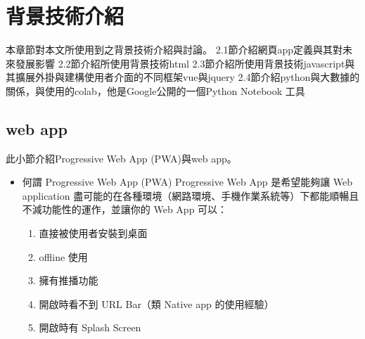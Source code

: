 \chapter{背景技術介紹}
\label{c:intro}
本章節對本文所使用到之背景技術介紹與討論。
2.1節介紹網頁app定義與其對未來發展影響
2.2節介紹所使用背景技術html
2.3節介紹所使用背景技術javascript與其擴展外掛與建構使用者介面的不同框架vue與jquery
2.4節介紹python與大數據的關係，與使用的colab，他是Google公開的一個Python Notebook 工具 
\section{web app} 
此小節介紹Progressive Web App (PWA)與web app。
\begin{itemize}
	\item 何謂 Progressive Web App (PWA)	
	Progressive Web App 是希望能夠讓 Web application 盡可能的在各種環境（網路環境、手機作業系統等）下都能順暢且不減功能性的運作，並讓你的 Web App 可以：
	\begin{enumerate}[1.]
		\item 直接被使用者安裝到桌面
		\item offline 使用
		\item 擁有推播功能
		\item 開啟時看不到 URL Bar（類 Native app 的使用經驗）
		\item 開啟時有 Splash Screen
	\end{enumerate}
\end{itemize}